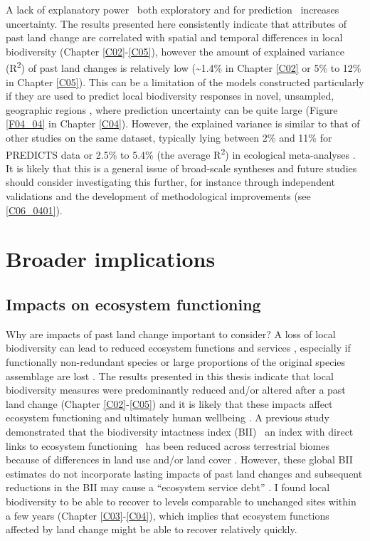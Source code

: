 A lack of explanatory power \textendash\ both exploratory and for prediction \textendash\ increases uncertainty. The results presented here consistently indicate that attributes of past land change are correlated with spatial and temporal differences in local biodiversity (Chapter \ref{C02}-\ref{C05}), however the amount of explained variance (R\textsuperscript{2}) of past land changes is relatively low (\textasciitilde 1.4\% in Chapter \ref{C02} or 5\% to 12\% in Chapter \ref{C05}). This can be a limitation of the models constructed particularly if they are used to predict local biodiversity responses in novel, \eg unsampled, geographic regions \citep{Jung2016}, where prediction uncertainty can be quite large (Figure \ref{F04_04} in Chapter \ref{C04}). However, the explained variance is similar to that of other studies on the same dataset, typically lying between 2\% and 11\% for PREDICTS data \citep{Newbold2014b,DePalma2015,Jung2016} or 2.5\% to 5.4\% (the average R\textsuperscript{2}) in ecological meta-analyses \citep{Moller2002}. It is likely that this is a general issue of broad-scale syntheses and future studies should consider investigating this further, for instance through independent validations and the development of methodological improvements (see \ref{C06_0401}).

\section{Broader implications}
\label{C06_03}
\subsection{Impacts on ecosystem functioning}
\label{C06_0301}

Why are impacts of past land change important to consider? A loss of local biodiversity can lead to reduced ecosystem functions and services \citep{Cardinale2012,Albrecht2014,Oliver2015b}, especially if functionally non-redundant species or large proportions of the original species assemblage are lost \citep{Oliver2015}. The results presented in this thesis indicate that local biodiversity measures were predominantly reduced and/or altered after a past land change (Chapter \ref{C02}-\ref{C05}) and it is likely that these impacts affect ecosystem functioning and ultimately human wellbeing \citep{Cardinale2012}. A previous study demonstrated that the biodiversity intactness index (BII) \textendash\ an index with direct links to ecosystem functioning \textendash\ has been reduced across terrestrial biomes because of differences in land use and/or land cover \citep{Newbold2016a}. However, these global BII estimates do not incorporate lasting impacts of past land changes and subsequent reductions in the BII may cause a “ecosystem service debt” \citep{Isbell2015}. I found local biodiversity to be able to recover to levels comparable to unchanged sites within a few years (Chapter \ref{C03}-\ref{C04}), which implies that ecosystem functions affected by land change might be able to recover relatively quickly. 

